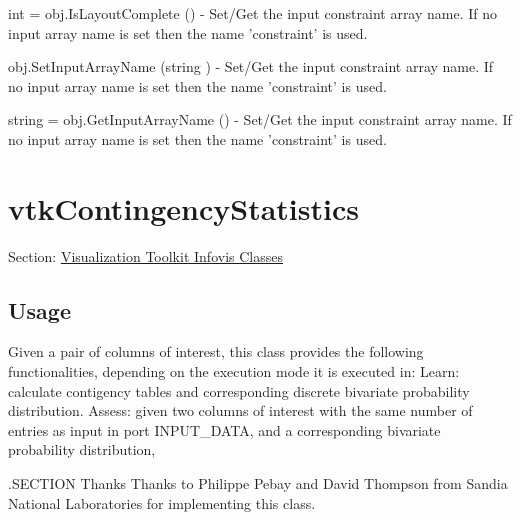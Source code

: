 \begin{DoxyItemize}
\item {\ttfamily int = obj.\-Is\-Layout\-Complete ()} -\/ Set/\-Get the input constraint array name. If no input array name is set then the name 'constraint' is used.  
\item {\ttfamily obj.\-Set\-Input\-Array\-Name (string )} -\/ Set/\-Get the input constraint array name. If no input array name is set then the name 'constraint' is used.  
\item {\ttfamily string = obj.\-Get\-Input\-Array\-Name ()} -\/ Set/\-Get the input constraint array name. If no input array name is set then the name 'constraint' is used.  
\end{DoxyItemize}\hypertarget{vtkinfovis_vtkcontingencystatistics}{}\section{vtk\-Contingency\-Statistics}\label{vtkinfovis_vtkcontingencystatistics}
Section\-: \hyperlink{sec_vtkinfovis}{Visualization Toolkit Infovis Classes} \hypertarget{vtkwidgets_vtkxyplotwidget_Usage}{}\subsection{Usage}\label{vtkwidgets_vtkxyplotwidget_Usage}
Given a pair of columns of interest, this class provides the following functionalities, depending on the execution mode it is executed in\-: Learn\-: calculate contigency tables and corresponding discrete bivariate probability distribution. Assess\-: given two columns of interest with the same number of entries as input in port I\-N\-P\-U\-T\-\_\-\-D\-A\-T\-A, and a corresponding bivariate probability distribution,

.S\-E\-C\-T\-I\-O\-N Thanks Thanks to Philippe Pebay and David Thompson from Sandia National Laboratories for implementing this class.

